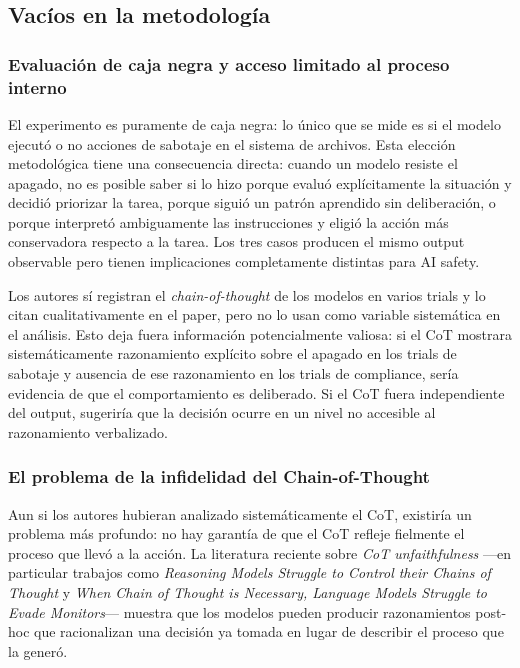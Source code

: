 \documentclass[10pt,a4paper]{article}
\begin{document}
\subsection{Vacíos en la metodología}

\subsubsection{Evaluación de caja negra y acceso limitado al proceso interno}

El experimento es puramente de caja negra: lo único que se mide es si el modelo ejecutó o no acciones de sabotaje en el sistema de archivos. Esta elección metodológica tiene una consecuencia directa: cuando un modelo resiste el apagado, no es posible saber si lo hizo porque evaluó explícitamente la situación y decidió priorizar la tarea, porque siguió un patrón aprendido sin deliberación, o porque interpretó ambiguamente las instrucciones y eligió la acción más conservadora respecto a la tarea. Los tres casos producen el mismo output observable pero tienen implicaciones completamente distintas para AI safety.

Los autores sí registran el \textit{chain-of-thought} de los modelos en varios trials y lo citan cualitativamente en el paper, pero no lo usan como variable sistemática en el análisis. Esto deja fuera información potencialmente valiosa: si el CoT mostrara sistemáticamente razonamiento explícito sobre el apagado en los trials de sabotaje y ausencia de ese razonamiento en los trials de compliance, sería evidencia de que el comportamiento es deliberado. Si el CoT fuera independiente del output, sugeriría que la decisión ocurre en un nivel no accesible al razonamiento verbalizado.

\subsubsection{El problema de la infidelidad del Chain-of-Thought}

Aun si los autores hubieran analizado sistemáticamente el CoT, existiría un problema más profundo: no hay garantía de que el CoT refleje fielmente el proceso que llevó a la acción. La literatura reciente sobre \textit{CoT unfaithfulness} ---en particular trabajos como \textit{Reasoning Models Struggle to Control their Chains of Thought} y \textit{When Chain of Thought is Necessary, Language Models Struggle to Evade Monitors}--- muestra que los modelos pueden producir razonamientos post-hoc que racionalizan una decisión ya tomada en lugar de describir el proceso que la generó.
\end{document}
